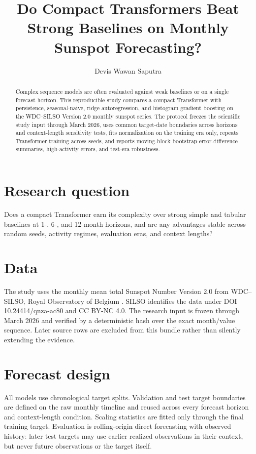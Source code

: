 \documentclass[11pt]{article}
\title{Do Compact Transformers Beat Strong Baselines on Monthly Sunspot Forecasting?}
\author{Devis Wawan Saputra}
\date{}
\begin{document}
\maketitle

\begin{abstract}
Complex sequence models are often evaluated against weak baselines or on a single forecast horizon. This reproducible study compares a compact Transformer with persistence, seasonal-naive, ridge autoregression, and histogram gradient boosting on the WDC--SILSO Version 2.0 monthly sunspot series. The protocol freezes the scientific study input through March 2026, uses common target-date boundaries across horizons and context-length sensitivity tests, fits normalization on the training era only, repeats Transformer training across seeds, and reports moving-block bootstrap error-difference summaries, high-activity errors, and test-era robustness.
\end{abstract}

\section{Research question}
Does a compact Transformer earn its complexity over strong simple and tabular baselines at 1-, 6-, and 12-month horizons, and are any advantages stable across random seeds, activity regimes, evaluation eras, and context lengths?

\section{Data}
The study uses the monthly mean total Sunspot Number Version 2.0 from WDC--SILSO, Royal Observatory of Belgium \cite{silso}. SILSO identifies the data under DOI 10.24414/qnza-ac80 and CC BY-NC 4.0. The research input is frozen through March 2026 and verified by a deterministic hash over the exact month/value sequence. Later source rows are excluded from this bundle rather than silently extending the evidence.

\section{Forecast design}
All models use chronological target splits. Validation and test target boundaries are defined on the raw monthly timeline and reused across every forecast horizon and context-length condition. Scaling statistics are fitted only through the final training target. Evaluation is rolling-origin direct forecasting with observed history: later test targets may use earlier realized observations in their context, but never future observations or the target itself.
\end{document}
